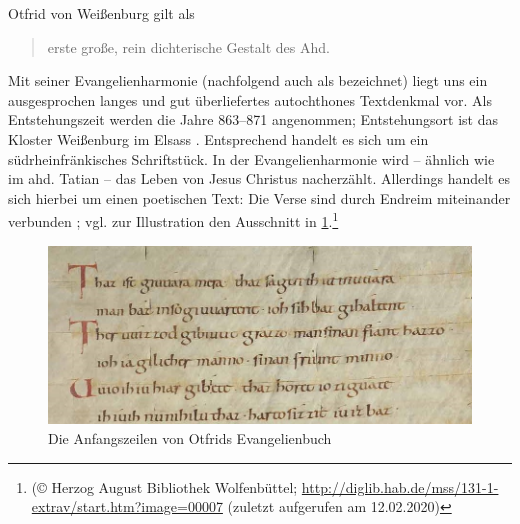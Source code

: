 Otfrid von Weißenburg gilt als \blockcquote[146]{Sonderegger2003}{erste große, rein dichterische Gestalt des Ahd.}. Mit seiner Evangelienharmonie (nachfolgend auch als  bezeichnet) liegt uns ein ausgesprochen langes und gut überliefertes autochthones Textdenkmal vor. Als Entstehungszeit werden die Jahre 863--871 angenommen; Entstehungsort ist das Kloster Weißenburg im Elsass \parencite[50]{Fleischer2011}. Entsprechend handelt es sich um ein südrheinfränkisches Schriftstück. In der Evangelienharmonie wird -- ähnlich wie im ahd. Tatian -- das Leben von Jesus Christus nacherzählt. Allerdings handelt es sich hierbei um einen poetischen Text: Die Verse sind durch Endreim miteinander verbunden   \parencite[zu Variationen im Versmaß s. ausführlich][148--150] {Sonderegger2003}; vgl. zur Illustration den Ausschnitt in \ref{abb:otfrid-hand}.\footnote{(© Herzog August Bibliothek Wolfenbüttel; \url{http://diglib.hab.de/mss/131-1-extrav/start.htm?image=00007} (zuletzt aufgerufen am 12.02.2020)}


\begin{figure}[h]
\begin{center}
  \includegraphics[width=10 cm]{images/otfrid-handschrift-ausschnitt.jpg}
  \caption {Die Anfangszeilen von Otfrids Evangelienbuch}
\label{abb:otfrid-hand}
\end{center}
\end{figure} 



